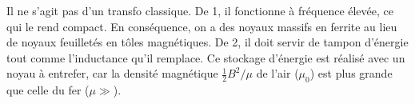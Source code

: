 	 Il ne s'agit pas d'un transfo classique. De 1, il fonctionne à fréquence élevée, ce qui le rend compact. En conséquence, on a des noyaux massifs en ferrite au lieu de noyaux feuilletés en tôles magnétiques. De 2, il doit servir de tampon d'énergie tout comme l'inductance qu'il remplace. Ce stockage d'énergie est réalisé avec un noyau à entrefer, car la densité magnétique $\frac{1}{2}B^2/\mu$ de l'air ($\mu _0$) est plus grande que celle du fer ($\mu \gg$).
